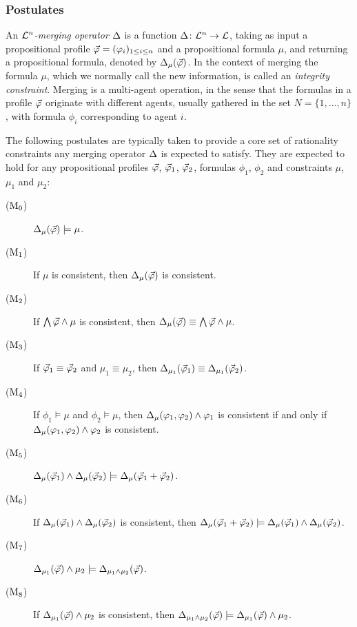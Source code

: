 \subsubsection{Postulates}
An \emph{$\L^{n}$-merging operator $\me$} 
is a function $\me\colon\L^n\rightarrow\L$,
taking as input 
a propositional profile $\P=(\phi_i)_{1\le i \le n}$
and a propositional formula $\mu$,
and returning a propositional formula, 
denoted by $\me_\mu(\P)$.
In the context of merging the formula $\mu$,
which we normally call the new information,
is called an \emph{integrity constraint}.
Merging is a multi-agent operation,
in the sense that the formulas in a profile $\P$
originate with different agents, 
usually gathered in the set $N=\{1,\dots,n\}$,
with formula $\phi_{i}$ corresponding to agent $i$.

The following postulates are typically taken to provide a core set of rationality constraints
any merging operator $\me$ is expected to satisfy.
They are expected to hold for any propositional profiles $\P$, $\P_1$, $\P_2$,
formulas $\phi_1$, $\phi_2$
and constraints $\mu$, $\mu_{1}$ and $\mu_{2}$:

\begin{description}
	\item[($\ppm{0}$)] $\me_\mu(\P)\models\mu$.
	\item[($\ppm{1}$)] If $\mu$ is consistent, then $\me_\mu(\P)$ is consistent.
	\item[($\ppm{2}$)] If $\bigwedge\P\land\mu$ is consistent, then $\me_\mu(\P)\equiv\bigwedge\P\land\mu$.
	\item[($\ppm{3}$)] If $\P_1\equiv \P_2$ and $\mu_1\equiv\mu_2$, 
	then $\me_{\mu_1}(\P_1)\equiv\me_{\mu_1}(\P_2)$.
	\item[($\ppm{4}$)] If $\phi_1\models\mu$ and $\phi_2\models\mu$, 
	then $\me_\mu(\phi_1,\phi_2)\land\phi_1$ is 
	consistent if and only if $\me_\mu(\phi_1,\phi_2)\land\phi_2$ is consistent.
	\item[($\ppm{5}$)] $\me_\mu(\P_1)\land\me_\mu(\P_2)\models\me_\mu(\append{\P_1}{\P_2})$.
	\item[($\ppm{6}$)] If $\me_\mu(\P_1)\land\me_\mu(\P_2)$ is consistent, then 
	$\me_\mu(\append{\P_1}{\P_2})\models\me_\mu(\P_1)\land\me_\mu(\P_2)$.
	\item[($\ppm{7}$)] $\me_{\mu_1}(\P)\land\mu_2\models\me_{\mu_1\land\mu_2}(\P)$.
	\item[($\ppm{8}$)] If $\me_{\mu_1}(\P)\land\mu_2$ is consistent, then
	$\me_{\mu_1\land\mu_2}(\P)\models\me_{\mu_1}(\P)\land\mu_2$.
\end{description}

